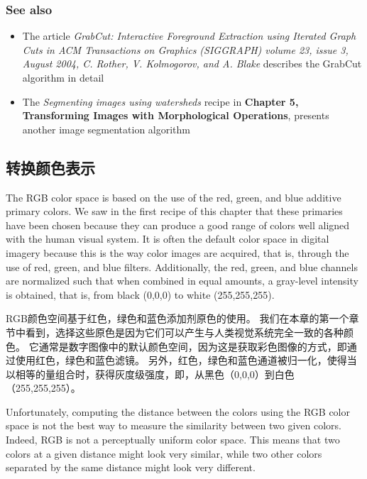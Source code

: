 \documentclass[]{article}
\begin{document}
\hypertarget{header-n1324}{%
\subsubsection{See also}\label{header-n1324}}

\begin{itemize}
\item
  The article \emph{GrabCut: Interactive Foreground Extraction using
  Iterated Graph Cuts in ACM Transactions on Graphics (SIGGRAPH) volume
  23, issue 3, August 2004, C. Rother, V. Kolmogorov, and A. Blake}
  describes the GrabCut algorithm in detail
\item
  The \emph{Segmenting images using watersheds} recipe in
  \textbf{Chapter 5, Transforming Images with Morphological Operations},
  presents another image segmentation algorithm 
\end{itemize}

\hypertarget{header-n1330}{%
\subsection{转换颜色表示}\label{header-n1330}}

The RGB color space is based on the use of the red, green, and blue
additive primary colors. We saw in the first recipe of this chapter that
these primaries have been chosen because they can produce a good range
of colors well aligned with the human visual system. It is often the
default color space in digital imagery because this is the way color
images are acquired, that is, through the use of red, green, and blue
filters. Additionally, the red, green, and blue channels are normalized
such that when combined in equal amounts, a gray-level intensity is
obtained, that is, from black (0,0,0) to white (255,255,255).

RGB颜色空间基于红色，绿色和蓝色添加剂原色的使用。
我们在本章的第一个章节中看到，选择这些原色是因为它们可以产生与人类视觉系统完全一致的各种颜色。
它通常是数字图像中的默认颜色空间，因为这是获取彩色图像的方式，即通过使用红色，绿色和蓝色滤镜。
另外，红色，绿色和蓝色通道被归一化，使得当以相等的量组合时，获得灰度级强度，即，从黑色（0,0,0）到白色（255,255,255）。

Unfortunately, computing the distance between the colors using the RGB
color space is not the best way to measure the similarity between two
given colors. Indeed, RGB is not a perceptually uniform color space.
This means that two colors at a given distance might look very similar,
while two other colors separated by the same distance might look very
different.
\end{document}
